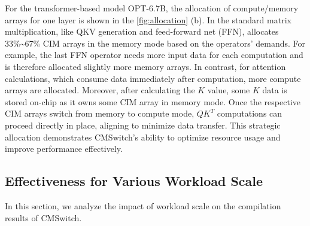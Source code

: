 For the transformer-based model OPT-6.7B, the allocation of compute/memory arrays for one layer is shown in the \fig \ref{fig:allocation} (b). In the standard matrix multiplication, like QKV generation and feed-forward net (FFN), \name allocates 33\%\textasciitilde 67\% CIM arrays in the memory mode based on the operators' demands. 
For example, the last FFN operator needs more input data for each computation and is therefore allocated slightly more memory arrays. In contrast, for attention calculations, which consume data immediately after computation, more compute arrays are allocated. Moreover, after calculating the $K$ value, some $K$ data is stored on-chip as it owns some CIM array in memory mode. Once the respective CIM arrays switch from memory to compute mode, $QK^T$ computations can proceed directly in place, aligning to minimize data transfer. This strategic allocation demonstrates CMSwitch's ability to optimize resource usage and improve performance effectively.


\subsection{Effectiveness for Various Workload Scale}
In this section, we analyze the impact of workload scale on the compilation results of CMSwitch.

